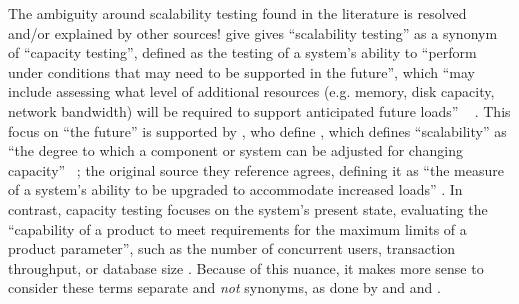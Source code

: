 The ambiguity around scalability testing found in the literature is resolved
and/or explained by other sources! \ifnotpaper \citeauthor{IEEE2021} give
\else \cite[p.~39]{IEEE2021} gives \fi ``scalability testing'' as a synonym
of ``capacity testing'', defined
as the testing of a system's ability to ``perform under conditions that may
need to be supported in the future'', which ``may include assessing what level
of additional resources (e.g. memory, disk capacity, network bandwidth) will
be required to support anticipated future loads''%
\ifnotpaper \ \citeyearpar[p.~39]{IEEE2021}%
\fi. This focus on ``the future'' is supported by
\ifnotpaper \citeauthor{ISTQB_author}, who define
\else \cite{ISTQB}, which defines
\fi ``scalability'' as ``the degree to which a component or system can be
adjusted for changing capacity''%
\ifnotpaper \ \citeyearpar{ISTQB}; the original source
    they reference agrees, defining it as ``the measure of a system's ability to be
    upgraded to accommodate increased loads'' \citep[p.~381]{GerrardAndThompson2002}%
\fi. In contrast, capacity testing focuses on the system's present state, evaluating
the ``capability of a product to meet requirements for the maximum limits of a
product parameter'', such as the number of concurrent users, transaction
throughput, or database size \citep{ISO_IEC2023a}. Because of this nuance, it
makes more sense to consider these terms separate and \emph{not} synonyms, as
done by
\ifnotpaper \citet[p.~53]{Firesmith2015} and \citet[pp.~22-23]{Bas2024}%
\else \cite[p.~53]{Firesmith2015} and \cite[pp.~22-23]{Bas2024}%
\fi.

